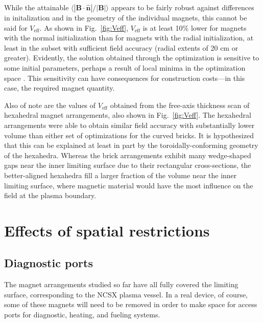 \documentclass[11pt,onecolumn]{article}
\newcommand{\relbnorm}{\langle|\mathbf{B}\cdot\hat{\mathbf{n}}|
                       /|\mathbf{B}|\rangle}
\begin{document}
While the attainable $\relbnorm$ appears to be fairly robust against differences
in initalization and in the geometry of the individual magnets, this cannot
be said for $V_\text{eff}$. As shown in Fig.~\ref{fig:Veff}, $V_\text{eff}$
is at least 10\% lower for magnets with the normal initialization than 
for magnets with the radial initialization, at least in the subset with 
sufficient field accuracy (radial extents of 20 cm or greater). Evidently,
the solution obtained through the optimization is sensitive to some initial
parameters, perhaps a result of local minima in the optimization 
space \cite{zhu2020b}. This sensitivity can have consequences for construction 
costs---in this case, the required magnet quantity.

Also of note are the values of $V_\text{eff}$ obtained from the free-axis
thickness scan of hexahedral magnet arrangements, also shown in 
Fig.~\ref{fig:Veff}. The hexahedral arrangements were able to
obtain similar field accuracy with substantially lower volume than 
either set of optimizations for the curved bricks. It is hypothesized that
this can be explained at least in part by the toroidally-conforming geometry
of the hexahedra. Whereas the brick arrangements exhibit many wedge-shaped
gaps near the inner limiting surface due to their rectangular cross-sections, 
the better-aligned hexahedra fill a larger fraction of the volume near the
inner limiting surface, where magnetic material would have the most influence 
on the field at the plasma boundary.

\section{Effects of spatial restrictions}
\label{sect:restrictions}

\subsection{Diagnostic ports}
\label{ssect:ports}

The magnet arrangements studied so far have all fully covered the limiting
surface, corresponding to the NCSX plasma vessel. In a real device, of course,
some of these magnets will need to be removed in order to make space for 
access ports for diagnostic, heating, and fueling systems.
\end{document}
